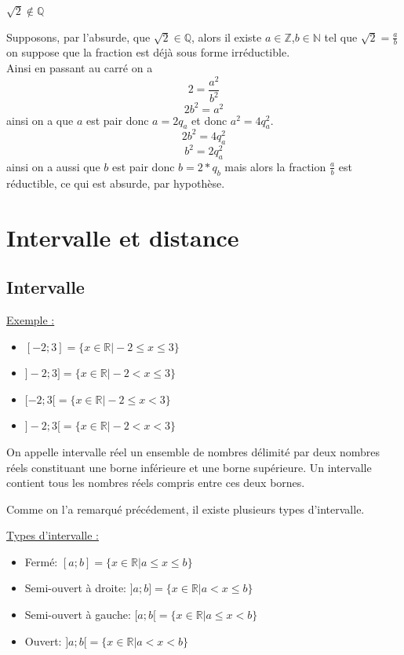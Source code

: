 \documentclass[french]{book}
\newcommand{\R}{\mathbb {R}}
\newcommand{\N}{\mathbb {N}}
\newcommand{\Z}{\mathbb {Z}}
\newcommand{\Q}{\mathbb {Q}}
\begin{document}
\newpage

\begin{thm}
$\sqrt{2} \notin \Q$
\vspace{2mm}
\end{thm}

\begin{demo}
Supposons, par l'absurde, que $\sqrt{2} \in \Q$, alors il existe $a \in \Z$,$b \in \N$ tel que $\sqrt{2}=\frac{a}{b}$ on suppose que la fraction est déjà sous forme irréductible.\\

Ainsi en passant au carré on a 
$$2=\frac{a^2}{b^2}$$
$$2b^2=a^2$$
ainsi on a que $a$ est pair donc $a=2q_a$ et donc  $a^2=4q^2_a$.\\
$$2b^2=4q^2_a$$
$$b^2=2q^2_a$$
ainsi on a aussi que $b$ est pair donc $b=2*q_b$ mais alors la fraction $\frac{a}{b}$ est réductible, ce qui est absurde, par hypothèse. 
\end{demo}

\section{Intervalle et distance}
\subsection{Intervalle}

\underline{Exemple :}
\begin{itemize}

\item[$\bullet$]$[-2;3]=\{ x\in \R \vert  -2 \leq x \leq 3 \}$
\item[$\bullet$]$]-2;3]=\{ x\in \R \vert  -2 < x \leq 3 \}$
\item[$\bullet$]$[-2;3[=\{ x\in \R \vert  -2 \leq x < 3 \}$
\item[$\bullet$]$]-2;3[=\{ x\in \R \vert  -2 < x < 3 \}$

\end{itemize}


\begin{defn}
On appelle intervalle réel un ensemble de nombres délimité par deux nombres réels constituant une borne inférieure et une borne supérieure. Un intervalle contient tous les nombres réels compris entre ces deux bornes.
\end{defn}

Comme on l'a remarqué précédement, il existe plusieurs types d'intervalle. 

\underline{Types d'intervalle :}
\begin{itemize}

\item{Fermé:} $[a;b]=\{ x\in \R \vert  a \leq x \leq b \}$
\item{Semi-ouvert à droite:} $]a;b]=\{ x\in \R \vert  a < x \leq b \}$
\item{Semi-ouvert à gauche:} $[a;b[=\{ x\in \R \vert  a \leq x < b \}$
\item{Ouvert:} $]a;b[=\{ x\in \R \vert  a < x < b \}$

\end{itemize}
\end{document}
